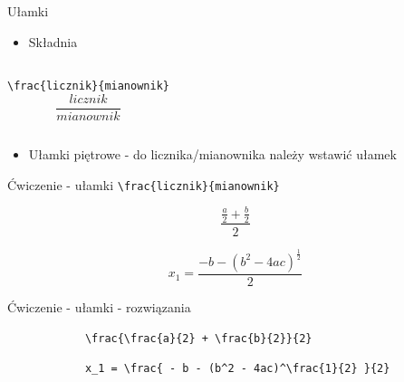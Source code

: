 \documentclass{beamer}
\theoremstyle{newblock}
\begin{document}
\begin{frame}[fragile]{Ułamki}
    \begin{itemize}
        \item Składnia
    \end{itemize}
    \begin{columns}[onlytextwidth,c]
            \centering
            \verb|\frac{licznik}{mianownik}|
            \centering
            \begin{equation*}
                \frac{licznik}{mianownik}
            \end{equation*}
    \end{columns}
    \begin{itemize}
        \item Ułamki piętrowe - do licznika/mianownika należy wstawić ułamek
    \end{itemize}
    
\end{frame}

\begin{frame}[fragile]{Ćwiczenie \showmycounter - ułamki}
    \centering
    \verb|\frac{licznik}{mianownik}| 
    
    \begin{examples}
        \begin{equation}
            \frac{\frac{a}{2} + \frac{b}{2}}{2}
        \end{equation}
    \end{examples}
    \begin{examples}
        \begin{equation}
            x_1 = \frac{- b - (b^2 - 4ac)^\frac{1}{2}}{2}
        \end{equation}
    \end{examples}

\end{frame}

\begin{frame}[fragile]{Ćwiczenie   - ułamki - rozwiązania}
    
    \begin{examples}
        \begin{verbatim}
            \frac{\frac{a}{2} + \frac{b}{2}}{2}
        \end{verbatim}
    \end{examples}
    \begin{examples}
        \centering
        \begin{verbatim}
            x_1 = \frac{ - b - (b^2 - 4ac)^\frac{1}{2} }{2}
        \end{verbatim}
    \end{examples}

\end{frame}
\end{document}
